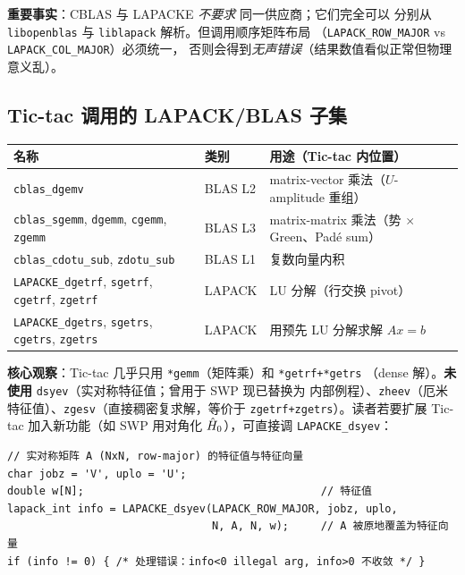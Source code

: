 \textbf{重要事实}：CBLAS 与 LAPACKE \emph{不要求} 同一供应商；它们完全可以
分别从 \texttt{libopenblas} 与 \texttt{liblapack} 解析。但调用顺序矩阵布局
（\texttt{LAPACK\_ROW\_MAJOR} vs \texttt{LAPACK\_COL\_MAJOR}）必须统一，
否则会得到\emph{无声错误}（结果数值看似正常但物理意义乱）。

\subsection{Tic-tac 调用的 LAPACK/BLAS 子集}

\begin{center}
\begin{tabular}{l l p{7.5cm}}
\toprule
名称 & 类别 & 用途（Tic-tac 内位置） \\
\midrule
\texttt{cblas\_dgemv} & BLAS L2 & matrix-vector 乘法（$U$-amplitude 重组） \\
\texttt{cblas\_sgemm}, \texttt{dgemm}, \texttt{cgemm}, \texttt{zgemm} & BLAS L3
                        & matrix-matrix 乘法（势 $\times$ Green、Padé sum） \\
\texttt{cblas\_cdotu\_sub}, \texttt{zdotu\_sub} & BLAS L1 & 复数向量内积 \\
\texttt{LAPACKE\_dgetrf}, \texttt{sgetrf}, \texttt{cgetrf}, \texttt{zgetrf}
                        & LAPACK & LU 分解（行交换 pivot） \\
\texttt{LAPACKE\_dgetrs}, \texttt{sgetrs}, \texttt{cgetrs}, \texttt{zgetrs}
                        & LAPACK & 用预先 LU 分解求解 $A x = b$ \\
\bottomrule
\end{tabular}
\end{center}

\textbf{核心观察}：Tic-tac 几乎只用 \texttt{*gemm}（矩阵乘）和 \texttt{*getrf+*getrs}
（dense 解）。\textbf{未使用} \texttt{dsyev}（实对称特征值；曾用于 SWP 现已替换为
内部例程）、\texttt{zheev}（厄米特征值）、\texttt{zgesv}（直接稠密复求解，等价于
\texttt{zgetrf+zgetrs}）。读者若要扩展 Tic-tac 加入新功能（如 SWP 用对角化
$\hat{H}_0$），可直接调 \texttt{LAPACKE\_dsyev}：

\begin{lstlisting}[style=cpp]
// 实对称矩阵 A (NxN, row-major) 的特征值与特征向量
char jobz = 'V', uplo = 'U';
double w[N];                                     // 特征值
lapack_int info = LAPACKE_dsyev(LAPACK_ROW_MAJOR, jobz, uplo,
                                N, A, N, w);     // A 被原地覆盖为特征向量
if (info != 0) { /* 处理错误：info<0 illegal arg, info>0 不收敛 */ }
\end{lstlisting}

